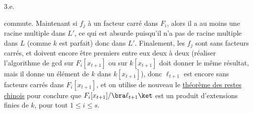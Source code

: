 \documentclass[11pt]{article}
\begin{document}
\begin{question}{3.e.}
\begin{figure}[H]
        \end{figure}
        commute. Maintenant si $f_j$ à un facteur carré dans $F_i$, alors il a au moins une racine multiple dans $L'$, ce qui est absurde puisqu'il n'a pas de racine multiple dans $L$ (comme $k$ est parfait) donc dans $L'$. Finalement, les $f_j$ sont sans facteurs carrés, et doivent encore être premiers entre eux deux à deux (réaliser l'algorithme de gcd sur $F_i[x_{t + 1}]$ ou sur $k[x_{t + 1}]$ doit donner le même résultat, mais il donne un élément de $k$ dans $k[x_{t + 1}]$), donc $\ell_{t + 1}$ est encore sans facteurs carrés dans $F_i[x_{t + 1}]$, et on utilise de nouveau le \hyperref[theo21]{théorème des restes chinois} pour conclure que $F_i[x_{t + 1}]/\bra \ell_{t + 1} \ket$ est un produit d'extensions finies de $k$, pour tout $1 \leq i \leq s$.
    \end{question}
\end{document}
